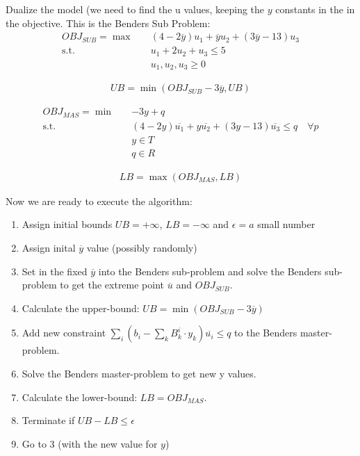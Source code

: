 \documentclass[fleqn,10pt]{wlscirep}
\begin{document}
Dualize the model (we need to find the u values, keeping the $y$ constants in the in the objective. This is the Benders Sub Problem:
\begin{align}
    OBJ_{SUB} = \max \quad& (4 - 2 \overline{y}) u_1 + \overline{y} u_2 + (3 \overline{y} - 13) u_3 \\
    \text{s.t.} \quad& u_1 + 2 u_2 + u_3 \leq 5 \\
    & u_1, u_2, u_3 \geq 0
\end{align}

\begin{align}
    UB = \min \left(OBJ_{SUB} - 3 \overline{y}, UB \right)
\end{align}

\begin{align}
    OBJ_{MAS} = \min \quad& - 3 y + q \\
    \text{s.t.} \quad& (4 - 2 y) \overline{u_1} + y \overline{u_2} + (3 y - 13) \overline{u_3} \leq q \quad \forall p \\
    & y \in T \\
    & q \in R
\end{align} 

\begin{align}
    LB = \max(OBJ_{MAS}, LB)
\end{align}

Now we are ready to execute the algorithm:
\begin{enumerate}
    \item Assign initial bounds $UB = +\infty$, $LB = -\infty$ and $\epsilon = a$ small number
    \item Assign inital $\overline{y}$ value (possibly randomly)
    \item Set in the fixed $\overline{y}$ into the Benders sub-problem and solve the Benders sub-problem to get the extreme point $\overline{u}$ and $OBJ_{SUB}$.
    \item Calculate the upper-bound: $UB = \min \left(OBJ_{SUB} - 3 \overline{y}\right)$
    \item Add new constraint $\sum _ { i } \left( b _ { i } - \sum _ { k } B _ { k } ^ { i } \cdot y _ { k } \right) \overline { u _ { i } } \leq q$ to the Benders master-problem.
    \item Solve the Benders master-problem to get new y values.
    \item Calculate the lower-bound: $LB = OBJ_{MAS}$.
    \item Terminate if $U B - L B \leq \epsilon$
    \item Go to 3 (with the new value for $y$)
\end{enumerate}
\end{document}
